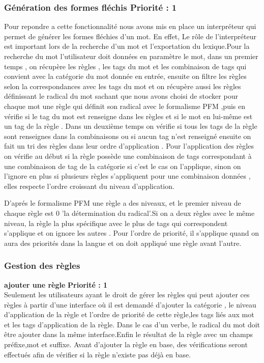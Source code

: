 \documentclass[12pt,a4paper]{article}
\begin{document}
 \subsubsection{Génération des formes fléchis  Priorité : 1} 
Pour repondre a cette fonctionnalité nous avons mis en place un interpréteur qui permet de générer les formes fléchies d'un mot.
En effet, Le rôle de l'interpréteur est important lors de la recherche d'un mot et l'exportation du lexique.Pour la recherche du mot l'utilisateur doit données en paramètre le mot, dans un premier temps , on récupère les règles , les tags du mot et les combinaison de tags qui convient avec la catégorie du mot donnée en entrée, ensuite on filtre les règles selon la correspondances avec les tags du mot et on récupère aussi les règles définissant le radical du mot sachant que nous avons choisi de stocker pour chaque mot une règle qui définit son radical avec le formalisme PFM ,puis en vérifie si le tag du mot est renseigne dans les règles et si le mot en lui-même est un tag de la règle . 
Dans un deuxième temps on vérifie si tous les tags de la règle sont renseignes dans la combinaisons ou si aucun tag n'est renseigné ensuite on fait un tri des règles dans leur ordre d'application .
Pour l'application des règles on vérifie au début si la règle possède une combinaison de tags correspondant à une combinaison de tag de la catégorie si c'est le cas on l'applique, sinon on l'ignore en plus si plusieurs règles s'appliquent pour une combinaison données , elles respecte l'ordre croissant du niveau d'application.

 D'aprés le formalisme PFM une règle a des niveaux, et le premier niveau de chaque règle est 0 'la détermination du radical'.Si on a deux règles  avec le même niveau, la règle la plus spécifique avec le plus de tags qui correspondent s'applique et on ignore les autres . Pour l'ordre de priorité, il s'applique quand on aura des priorités dans la langue et on doit appliqué une règle avant l'autre. 
\subsubsection{Gestion des règles }
\textbf{ajouter une règle } \textbf{Priorité : 1} \\ Seulement les utilisateurs ayant le droit de gérer les règles qui peut ajouter ces règles à partir d'une interface où il est demandé d'ajouter la catégorie , le niveau d'application de la règle et l'ordre de priorité de cette règle,les tags liés aux mot et les tags d'application de la règle. Dans le cas d'un  verbe, le radical du mot doit être ajouter dans la même interface.Enfin le résultat de la règle avec un champs préfixe,mot et suffixe.
Avant d'ajouter la règle en base, des vérifications seront effectués afin  de vérifier si la règle n'existe pas déjà en base.
\end{document}
